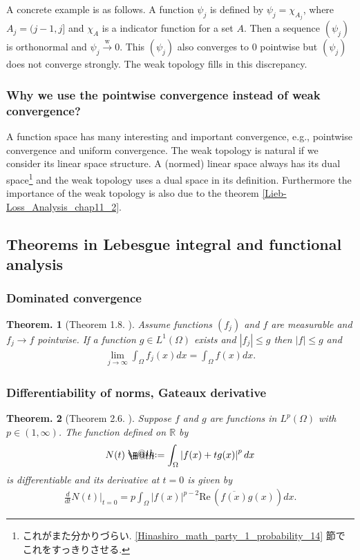 \documentclass[openany, a4paper, oneside]{jsbook}
\makeatletter
\newcommand*{\defeq}{\mathrel{\rlap{%
\raisebox{0.3ex}{$\m@th\cdot$}}%
\raisebox{-0.3ex}{$\m@th\cdot$}}%
=}
\theoremstyle{break}
\newtheorem{thm}{Theorem.}[section]
\theoremstyle{breakdefn}
\renewcommand{\Re}{\mathrm{Re} \,}
\newcommand{\abs}[1]{\left|#1\right|}
\newcommand{\rbk}[1]{\left (#1\right)}
\newcommand{\bbR}{\mathbb{R}}
\newcommand{\wto}{\xrightarrow{\text{w}}}
\makeatother
\begin{document}
A concrete example is as follows.
A function $\psi_j$ is defined by $\psi_j = \chi_{A_j}$, where $A_j = (j-1, j]$ and $\chi_A$ is a indicator function for a set $A$.
Then a sequence $(\psi_j)$ is orthonormal and $\psi_j \wto 0$.
This $(\psi_j)$ also converges to $0$ pointwise but $(\psi_j)$ does not converge strongly.
The weak topology fills in this discrepancy.
\subsubsection{Why we use the pointwise convergence instead of weak convergence?}


A function space has many interesting and important convergence, e.g., pointwise convergence and uniform convergence.
The weak topology is natural if we consider its linear space structure.
A (normed) linear space always has its dual space\footnote{これがまた分かりづらい. \ref{Hinashiro_math_party_1_probability_14} 節でこれをすっきりさせる.
 } and the weak topology uses a dual space in its definition.
Furthermore the importance of the weak topology is also due to the theorem \ref{Lieb-Loss_Analysis_chap11_2}.
\subsection{Theorems in Lebesgue integral and functional analysis}

\subsubsection{Dominated convergence}


\begin{thm}[Theorem 1.8. \cite{LiebLoss1}]\label{Lieb-Loss_Analysis_chap11_6}
 Assume functions $(f_j)$ and $f$ are measurable and $f_j \to f$ pointwise.
 If a function $g \in L^1 (\Omega)$ exists and $\abs{f_j} \leq g$ then $\abs{f} \leq g$ and
 \begin{align}
  \lim_{j \to \infty} \int_{\Omega} f_j (x) dx
  =
  \int_{\Omega} f (x) dx.
 \end{align}
\end{thm}
\subsubsection{Differentiability of norms, Gateaux derivative}


\begin{thm}[Theorem 2.6. \cite{LiebLoss1}]\label{Lieb-Loss_Analysis_chap11_26}
 Suppose $f$ and $g$ are functions in $L^p (\Omega)$ with $p \in \rbk{1, \infty}$.
 The function defined on $\bbR$ by
 \begin{align}
  N (t)
  \defeq
  \int_{\Omega} \abs{f (x) + t g (x)}^{p} dx
 \end{align}
 is differentiable and its derivative at $t = 0$ is given by
 \begin{align}
  \frac{d}{dt} N (t) \Big |_{t=0}
  =
  p \int_{\Omega} \abs{f (x)}^{p-2} \Re \rbk{\overline{f (x)} g (x)} dx.
 \end{align}
\end{thm}
\end{document}
